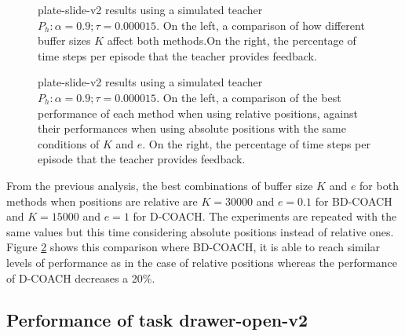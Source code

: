 
 \begin{figure}[H]
  \centering
   \hfill
  \caption{plate-slide-v2 results using a simulated teacher $P_h: \alpha = 0.9; \tau =  0.000015$. On the left, a comparison of how different buffer sizes $K$ affect both methods.On the right, the percentage of time steps per episode that the teacher  provides feedback.}
  \label{fig:results_plate_slide_buffer_e}
\end{figure}

 \begin{figure}[H]
  \centering
   \hfill
  \caption{plate-slide-v2 results using a simulated teacher $P_h: \alpha = 0.9; \tau =  0.000015$. On the left, a comparison of the best performance of each method when using relative positions, against their performances when using absolute positions with the same conditions of $K$ and $e$. On the right, the percentage of time steps per episode that the teacher  provides feedback.}
  \label{fig:results-plate-slide-best}
\end{figure}











      
From the previous analysis, the best combinations of buffer size $K$ and $e$ for both methods when positions are relative are $K=30000$ and $e=0.1$ for BD-COACH and $K=15000$ and $e=1$ for D-COACH. The experiments are repeated with the same values but this time considering absolute positions instead of relative ones. Figure \ref{fig:results-plate-slide-best} shows this comparison where BD-COACH, it is able to reach similar levels of performance as in the case of relative positions whereas the performance of D-COACH decreases a 20\%.


\subsection{Performance of task drawer-open-v2}
\label{subsection:Performance of task drawer_open_v2}




